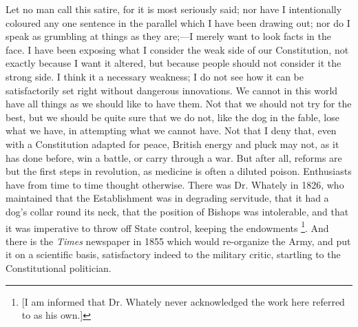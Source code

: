 Let no man call this satire, for it is most
seriously said; nor have I intentionally coloured any one sentence in
the parallel which I have been drawing out; nor do I speak as
grumbling at things as they are;—I merely want to look facts in the
face. I have been exposing what I consider the weak side of our
Constitution, not exactly because I want it altered, but because
people should not consider it the strong side. I think it a necessary
weakness; I do not see how it can be satisfactorily set right without
dangerous innovations. We cannot in this world have all things as we
should like to have them. Not that we should not try for the best, but
we should be quite sure that we do not, like the dog in the fable,
lose what we have, in attempting what we cannot have. Not that I deny
that, even with a Constitution adapted for peace, British energy and
pluck may not, as it has done before, win a battle, or carry through a
war. But after all, reforms are but the first steps in revolution, as
medicine is often a diluted poison. Enthusiasts have from time to time
thought otherwise. There was Dr. Whately in 1826, who maintained that
the Establishment was in degrading servitude, that it had a dog's
collar round its neck, that the position of Bishops was intolerable,
and that it was imperative to throw off State control, keeping the
endowments \footnote{[I am informed that Dr. Whately never
acknowledged the work here referred to as his own.]}. And there is
the \emph{Times} newspaper in 1855 which would re-organize the Army,
and put it on a scientific basis, satisfactory indeed to the military
critic, startling to the Constitutional politician.

